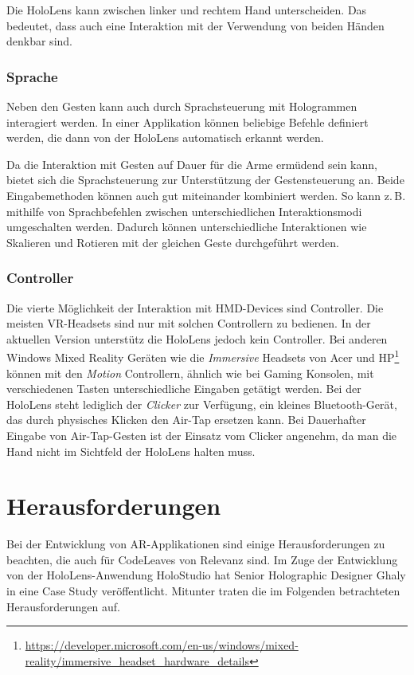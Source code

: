 Die HoloLens kann zwischen linker und rechtem Hand unterscheiden. Das bedeutet, dass auch eine Interaktion mit der Verwendung von beiden Händen denkbar sind.

\subsubsection*{Sprache}
Neben den Gesten kann auch durch Sprachsteuerung mit Hologrammen interagiert werden. In einer Applikation können beliebige Befehle definiert werden, die dann von der HoloLens automatisch erkannt werden.

Da die Interaktion mit Gesten auf Dauer für die Arme ermüdend sein kann, bietet sich die Sprachsteuerung zur Unterstützung der Gestensteuerung an. Beide Eingabemethoden können auch gut miteinander kombiniert werden. So kann z.\,B. mithilfe von Sprachbefehlen zwischen unterschiedlichen Interaktionsmodi umgeschalten werden. Dadurch können unterschiedliche Interaktionen wie Skalieren und Rotieren mit der gleichen Geste durchgeführt werden.

\subsubsection*{Controller}
Die vierte Möglichkeit der Interaktion mit HMD-Devices sind Controller. Die meisten VR-Headsets sind nur mit solchen Controllern zu bedienen. In der aktuellen Version unterstütz die HoloLens jedoch kein Controller. Bei anderen Windows Mixed Reality Geräten wie die \textit{Immersive} Headsets von Acer und HP\footnote{\url{https://developer.microsoft.com/en-us/windows/mixed-reality/immersive_headset_hardware_details}} können mit den \textit{Motion} Controllern, ähnlich wie bei Gaming Konsolen, mit verschiedenen Tasten unterschiedliche Eingaben getätigt werden. Bei der HoloLens steht lediglich der \textit{Clicker} zur Verfügung, ein kleines Bluetooth-Gerät, das durch physisches Klicken den Air-Tap ersetzen kann. Bei Dauerhafter Eingabe von Air-Tap-Gesten ist der Einsatz vom Clicker angenehm, da man die Hand nicht im Sichtfeld der HoloLens halten muss.

\section{Herausforderungen}

Bei der Entwicklung von AR-Applikationen sind einige Herausforderungen zu beachten, die auch für CodeLeaves von Relevanz sind. Im Zuge der Entwicklung von der HoloLens-Anwendung HoloStudio hat Senior Holographic Designer Ghaly in \cite{windows2017casestudy3} eine Case Study veröffentlicht. Mitunter traten die im Folgenden betrachteten Herausforderungen auf.

